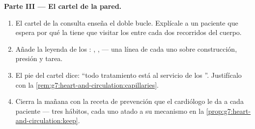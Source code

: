 \begin{problem}
\medskip\noindent\textbf{Parte III --- El cartel de la pared.}
\begin{enumerate}[resume]
  \item El cartel de la consulta enseña el doble bucle. Explícale a un
        paciente que espera por qué la  tiene que visitar los
         entre cada dos recorridos del cuerpo.
  \item Añade la leyenda de los : , ,  --- una
        línea de cada uno sobre construcción, presión y tarea.
  \item El pie del cartel dice: ``todo tratamiento está al servicio de
        los ''. Justifícalo con la
        \cref{rem:g7:heart-and-circulation:capillaries}.
  \item Cierra la mañana con la receta de prevención que el cardiólogo
        le da a cada paciente --- tres hábitos, cada uno atado a su
        mecanismo en la \cref{prop:g7:heart-and-circulation:keep}.
\end{enumerate}
\end{problem}
